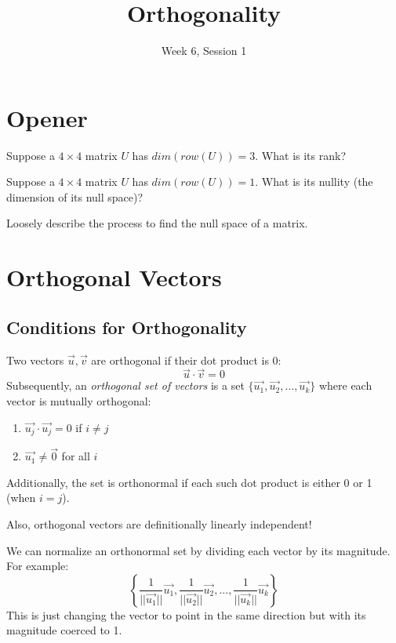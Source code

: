 \documentclass[11pt]{exam}
\title{Orthogonality}
\date{Week 6, Session 1}
\begin{document}
\maketitle

\section{Opener}
    \vspace{20px}
    \begin{questions}
        \item Suppose a $4 \times 4$ matrix $U$ has $dim(row(U)) = 3$. What is its rank?
        \item Suppose a $4 \times 4$ matrix $U$ has $dim(row(U)) = 1$. What is its nullity (the dimension of its null space)?
        \item Loosely describe the process to find the null space of a matrix.
    \end{questions}

\vspace{40px}
\section{Orthogonal Vectors}
    
    \vspace{20px}
    \subsection{Conditions for Orthogonality}
    Two vectors $\vec{u}, \vec{v}$ are orthogonal if their dot product is 0:
    $$\vec{u} \cdot \vec{v} = 0$$
    Subsequently, an \textit{orthogonal set of vectors} is a set $\{ \vec{u_1}, \vec{u_2}, \dots, \vec{u_k} \}$ where each vector is mutually orthogonal:
    \begin{enumerate}
        \item $\vec{u_j} \cdot \vec{u_j} = 0$ if $i \neq j$
        \item $\vec{u_1} \neq \vec{0}$ for all $i$
    \end{enumerate}
    Additionally, the set is orthonormal if each such dot product is either 0 or 1 (when $i = j$).

    Also, orthogonal vectors are definitionally linearly independent!

    We can normalize an orthonormal set by dividing each vector by its magnitude. For example:
    $$ \left \{ \dfrac{1}{||\vec{u_1}||} \vec{u_1},  \dfrac{1}{||\vec{u_2}||} \vec{u_2}, \dots, \dfrac{1}{||\vec{u_k}||} \vec{u_k} \right \}$$
    This is just changing the vector to point in the same direction but with its magnitude coerced to 1.
\end{document}
